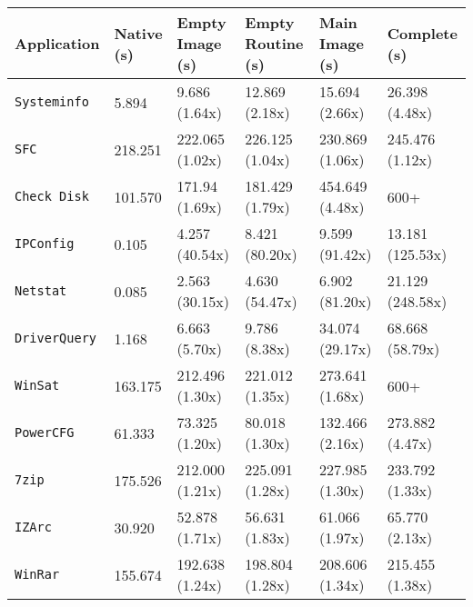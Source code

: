 \vspace*{0.8cm}
\begin{sidewaystable}
\centering
\newcommand{\specialcell}[2][c]{%
  \begin{tabular}[#1]{@{}c@{}}#2\end{tabular}}
\begin{tabularx}{\linewidth}{*{6}{Y}}

\hline
\hline
   \textbf{Application} & \specialcell{ \textbf{Native} \\ \textbf{(s)}} & \specialcell{ \textbf{Empty Image} \\ \textbf{(s)}} & \specialcell{ \textbf{Empty Routine} \\ \textbf{(s)}} & \specialcell{ \textbf{Main Image} \\ \textbf{(s)}} & \specialcell{ \textbf{Complete} \\ \textbf{(s)}} \\
\hline
\texttt{Systeminfo}      & 5.894    & 9.686 (1.64x)  & 12.869 (2.18x) & 15.694 (2.66x) & 26.398 (4.48x)     \\
\texttt{SFC}          & 218.251 & 222.065 (1.02x) & 226.125 (1.04x) & 230.869 (1.06x) & 245.476 (1.12x)       \\
\texttt{Check Disk}       & 101.570     & 171.94 (1.69x) & 181.429 (1.79x) & 454.649 (4.48x) & 600+       \\
\texttt{IPConfig}       & 0.105     & 4.257 (40.54x) & 8.421 (80.20x) & 9.599 (91.42x) & 13.181 (125.53x)      \\
\texttt{Netstat} & 0.085 & 2.563 (30.15x) & 4.630 (54.47x) & 6.902 (81.20x) & 21.129 (248.58x)       \\
\texttt{DriverQuery} & 1.168 & 6.663 (5.70x) & 9.786 (8.38x) & 34.074 (29.17x) & 68.668 (58.79x)     \\
\texttt{WinSat}       & 163.175     & 212.496 (1.30x) & 221.012 (1.35x) & 273.641 (1.68x) & 600+      \\
\texttt{PowerCFG} & 61.333      & 73.325 (1.20x) & 80.018 (1.30x) & 132.466 (2.16x) & 273.882 (4.47x)       \\
\texttt{7zip}       & 175.526     & 212.000 (1.21x) & 225.091 (1.28x) & 227.985 (1.30x) & 233.792 (1.33x)      \\
\texttt{IZArc}      & 30.920     & 52.878 (1.71x) & 56.631 (1.83x) & 61.066 (1.97x) & 65.770 (2.13x)      \\
\texttt{WinRar} & 155.674 & 192.638 (1.24x) & 198.804 (1.28x) & 208.606 (1.34x) & 215.455 (1.38x)      \\

\end{tabularx}
\end{sidewaystable}
